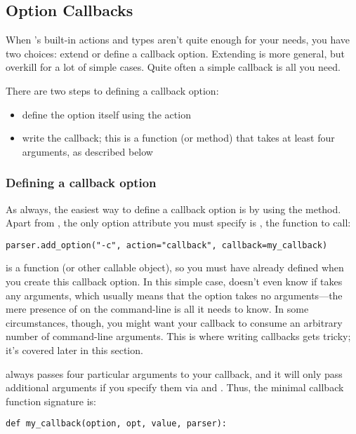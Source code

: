 \subsection{Option Callbacks\label{optparse-option-callbacks}}

When 's built-in actions and types aren't quite enough for your
needs, you have two choices: extend  or define a callback option.
Extending  is more general, but overkill for a lot of simple
cases.  Quite often a simple callback is all you need.

There are two steps to defining a callback option:
\begin{itemize}
\item {} 
define the option itself using the  action

\item {} 
write the callback; this is a function (or method) that
takes at least four arguments, as described below

\end{itemize}


\subsubsection{Defining a callback option\label{optparse-defining-callback-option}}

As always, the easiest way to define a callback option is by using the
 method.  Apart from , the only option
attribute you must specify is , the function to call:
\begin{verbatim}
parser.add_option("-c", action="callback", callback=my_callback)
\end{verbatim}

 is a function (or other callable object), so you must have
already defined  when you create this callback option.
In this simple case,  doesn't even know if  takes any
arguments, which usually means that the option takes no arguments{---}the
mere presence of  on the command-line is all it needs to know.  In
some circumstances, though, you might want your callback to consume an
arbitrary number of command-line arguments.  This is where writing
callbacks gets tricky; it's covered later in this section.

 always passes four particular arguments to your callback, and it
will only pass additional arguments if you specify them via
 and .  Thus, the minimal callback
function signature is:
\begin{verbatim}
def my_callback(option, opt, value, parser):
\end{verbatim}

